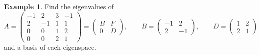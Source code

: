 \documentclass[12pt]{article}
\theoremstyle{definition}
\newtheorem{example}[theorem]{Example}
\begin{document}
\begin{example}\label{r7-exm-three}
Find the eigenvalues of
\[
A=\begin{pmatrix}-1&2&3&-1\\2&-1&1&1\\0&0&1&2\\0&0&2&1\end{pmatrix}=\begin{pmatrix}B&F\\0&D\end{pmatrix},\qquad
B=\begin{pmatrix}-1&2\\2&-1\end{pmatrix},\qquad D=\begin{pmatrix}1&2\\2&1\end{pmatrix}
\]
and a basis of each eigenspace.


\end{example}
\end{document}
